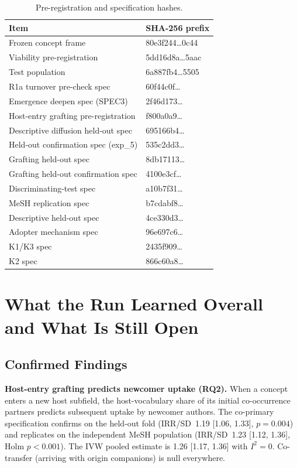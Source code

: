 \documentclass[11pt,letterpaper]{article}
\begin{document}
\begin{table}[!htbp]
\centering
\caption{Pre-registration and specification hashes.}
\label{tab:hashes}
{\small
\begin{tabular}{L{5cm}l}
\toprule
Item & SHA-256 prefix \\
\midrule
Frozen concept frame & 80e3f244\ldots 0c44 \\
Viability pre-registration & 5dd16d8a\ldots 5aac \\
Test population & 6a887fb4\ldots 5505 \\
R1a turnover pre-check spec & 60f44c0f\ldots \\
Emergence deepen spec (SPEC3) & 2f46d173\ldots \\
Host-entry grafting pre-registration & f800a0a9\ldots \\
Descriptive diffusion held-out spec & 695166b4\ldots \\
Held-out confirmation spec (exp\_5) & 535c2dd3\ldots \\
Grafting held-out spec & 8db17113\ldots \\
Grafting held-out confirmation spec & 4100e3cf\ldots \\
Discriminating-test spec & a10b7f31\ldots \\
MeSH replication spec & b7cdabf8\ldots \\
Descriptive held-out spec & 4ce330d3\ldots \\
Adopter mechanism spec & 96e697c6\ldots \\
K1/K3 spec & 2435f909\ldots \\
K2 spec & 866c60a8\ldots \\
\bottomrule
\end{tabular}
}
\end{table}


\section{What the Run Learned Overall and What Is Still Open}
\label{sec:conclusion}

\subsection{Confirmed Findings}

\textbf{Host-entry grafting predicts newcomer uptake (RQ2).}
When a concept enters a new host subfield, the host-vocabulary share of its initial co-occurrence partners predicts subsequent uptake by newcomer authors.
The co-primary specification confirms on the held-out fold (IRR/SD~1.19 [1.06, 1.33], $p = 0.004$) and replicates on the independent MeSH population (IRR/SD~1.23 [1.12, 1.36], Holm $p < 0.001$).
The IVW pooled estimate is 1.26 [1.17, 1.36] with $I^2 = 0$.
Co-transfer (arriving with origin companions) is null everywhere.
\end{document}
